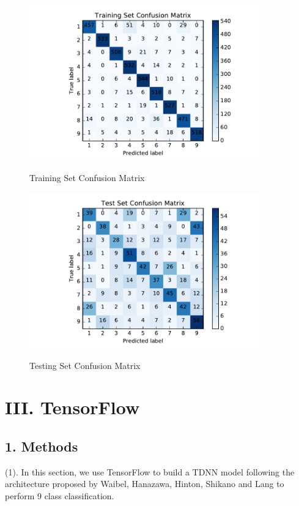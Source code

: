 \begin{figure}[H]
\centering
\includegraphics[width=0.9\textwidth]{./figures/trainMatrix.pdf}\
\caption{\label{fig:trainMatrix} Training Set Confusion Matrix}
\end{figure}


\begin{figure}[H]
\centering
\includegraphics[width=0.9\textwidth]{./figures/testMatrix.pdf}\
\caption{\label{fig:testMatrix} Testing Set Confusion Matrix}
\end{figure}


\newpage
\section*{\Large III. TensorFlow}

\subsection*{\large 1. Methods}

(1). In this section, we use TensorFlow to build a TDNN model following the architecture proposed by Waibel, Hanazawa, Hinton, Shikano and Lang to perform 9 class classification. \\

